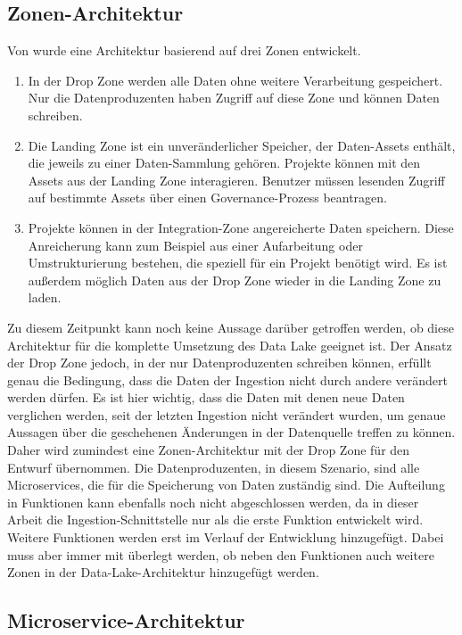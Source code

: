 \subsection{Zonen-Architektur}
Von \textcite{ingestion_02} wurde eine Architektur basierend auf drei Zonen entwickelt.
\begin{enumerate}
    \item In der Drop Zone werden alle Daten ohne weitere Verarbeitung gespeichert.
          Nur die Datenproduzenten haben Zugriff auf diese Zone und können Daten schreiben.
    \item Die Landing Zone ist ein unveränderlicher Speicher, der Daten-Assets enthält, die jeweils zu einer Daten-Sammlung gehören. Projekte können mit den Assets aus der Landing Zone interagieren.
          Benutzer müssen lesenden Zugriff auf bestimmte Assets über einen Governance-Prozess beantragen.
    \item Projekte können in der Integration-Zone angereicherte Daten speichern.
          Diese Anreicherung kann zum Beispiel aus einer Aufarbeitung oder Umstrukturierung bestehen, die speziell für ein Projekt benötigt wird.
          Es ist außerdem möglich Daten aus der Drop Zone wieder in die Landing Zone zu laden.
\end{enumerate}
Zu diesem Zeitpunkt kann noch keine Aussage darüber getroffen werden, ob diese Architektur für die komplette Umsetzung des Data Lake geeignet ist.
Der Ansatz der Drop Zone jedoch, in der nur Datenproduzenten schreiben können, erfüllt genau die Bedingung, dass die Daten der Ingestion nicht durch andere verändert werden dürfen.
Es ist hier wichtig, dass die Daten mit denen neue Daten verglichen werden, seit der letzten Ingestion nicht verändert wurden, um genaue Aussagen über die geschehenen Änderungen in der Datenquelle treffen zu können.
Daher wird zumindest eine Zonen-Architektur mit der Drop Zone für den Entwurf übernommen.
Die Datenproduzenten, in diesem Szenario, sind alle Microservices, die für die Speicherung von Daten zuständig sind.
Die Aufteilung in Funktionen kann ebenfalls noch nicht abgeschlossen werden, da in dieser Arbeit die Ingestion-Schnittstelle nur als die erste Funktion entwickelt wird.
Weitere Funktionen werden erst im Verlauf der Entwicklung hinzugefügt.
Dabei muss aber immer mit überlegt werden, ob neben den Funktionen auch weitere Zonen in der Data-Lake-Architektur hinzugefügt werden.

\subsection{Microservice-Architektur}
\label{sec:arch}

